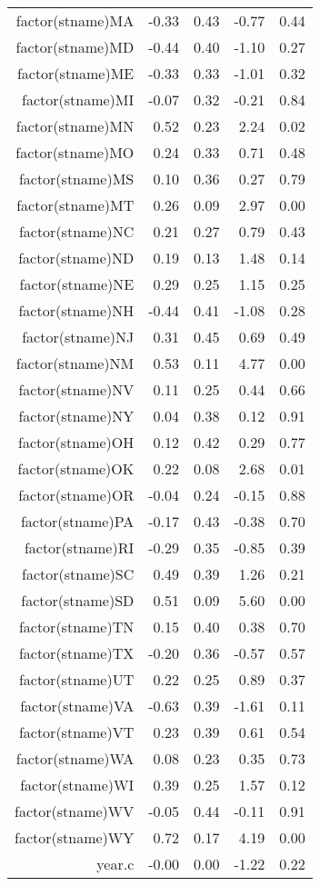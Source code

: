 \begin{table}[ht]
\begin{tabular}{rrrrr}
  factor(stname)MA & -0.33 & 0.43 & -0.77 & 0.44 \\ 
  factor(stname)MD & -0.44 & 0.40 & -1.10 & 0.27 \\ 
  factor(stname)ME & -0.33 & 0.33 & -1.01 & 0.32 \\ 
  factor(stname)MI & -0.07 & 0.32 & -0.21 & 0.84 \\ 
  factor(stname)MN & 0.52 & 0.23 & 2.24 & 0.02 \\ 
  factor(stname)MO & 0.24 & 0.33 & 0.71 & 0.48 \\ 
  factor(stname)MS & 0.10 & 0.36 & 0.27 & 0.79 \\ 
  factor(stname)MT & 0.26 & 0.09 & 2.97 & 0.00 \\ 
  factor(stname)NC & 0.21 & 0.27 & 0.79 & 0.43 \\ 
  factor(stname)ND & 0.19 & 0.13 & 1.48 & 0.14 \\ 
  factor(stname)NE & 0.29 & 0.25 & 1.15 & 0.25 \\ 
  factor(stname)NH & -0.44 & 0.41 & -1.08 & 0.28 \\ 
  factor(stname)NJ & 0.31 & 0.45 & 0.69 & 0.49 \\ 
  factor(stname)NM & 0.53 & 0.11 & 4.77 & 0.00 \\ 
  factor(stname)NV & 0.11 & 0.25 & 0.44 & 0.66 \\ 
  factor(stname)NY & 0.04 & 0.38 & 0.12 & 0.91 \\ 
  factor(stname)OH & 0.12 & 0.42 & 0.29 & 0.77 \\ 
  factor(stname)OK & 0.22 & 0.08 & 2.68 & 0.01 \\ 
  factor(stname)OR & -0.04 & 0.24 & -0.15 & 0.88 \\ 
  factor(stname)PA & -0.17 & 0.43 & -0.38 & 0.70 \\ 
  factor(stname)RI & -0.29 & 0.35 & -0.85 & 0.39 \\ 
  factor(stname)SC & 0.49 & 0.39 & 1.26 & 0.21 \\ 
  factor(stname)SD & 0.51 & 0.09 & 5.60 & 0.00 \\ 
  factor(stname)TN & 0.15 & 0.40 & 0.38 & 0.70 \\ 
  factor(stname)TX & -0.20 & 0.36 & -0.57 & 0.57 \\ 
  factor(stname)UT & 0.22 & 0.25 & 0.89 & 0.37 \\ 
  factor(stname)VA & -0.63 & 0.39 & -1.61 & 0.11 \\ 
  factor(stname)VT & 0.23 & 0.39 & 0.61 & 0.54 \\ 
  factor(stname)WA & 0.08 & 0.23 & 0.35 & 0.73 \\ 
  factor(stname)WI & 0.39 & 0.25 & 1.57 & 0.12 \\ 
  factor(stname)WV & -0.05 & 0.44 & -0.11 & 0.91 \\ 
  factor(stname)WY & 0.72 & 0.17 & 4.19 & 0.00 \\ 
  year.c & -0.00 & 0.00 & -1.22 & 0.22 \\ 
   \hline
\end{tabular}
\end{table}
